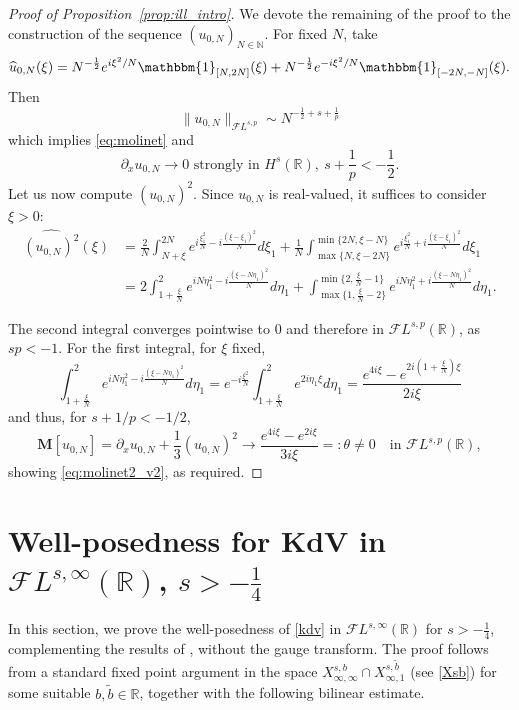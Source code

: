 \documentclass[%
11pt,  reqno]{amsart}
\newcommand{\5}{\textup{V}}
\newcommand{\noi}{\noindent}
\newcommand{\FL}{\mathcal{F} L}
\newcommand{\F}{\mathcal{F}}
\newcommand{\wt}{\widetilde}
\newcommand{\dx}{\partial_x}
\theoremstyle{remark}
\newcommand{\R}{\mathbb{R}}
\newcommand{\MMb}{\mathbf{M}}
\newcommand{\N}{\mathbb{N}}
\numberwithin{equation}{section}
\numberwithin{theorem}{section}
\begin{document}
\begin{proof}[Proof of Proposition~\ref{prop:ill_intro}]
We devote the remaining of the proof to the construction of the sequence $(u_{0,N})_{N\in\N}$. 
	For fixed $N$, take
	$$
	\widehat{u}_{0,N}(\xi)= N^{-\frac12} e^{i\xi^2/N}\mathbbm{1}_{[N, 2N]}(\xi) + N^{-\frac12} e^{-i\xi^2/N}\mathbbm{1}_{[-2N, -N]}(\xi).
	$$
	Then 
	$$
	\|u_{0,N}\|_{\mathcal{F}L^{s,p}} \sim N^{-\frac12 +s+ \frac1p}
	$$
	which implies \eqref{eq:molinet} and
	$$
	\dx u_{0,N} \to 0 \mbox{ strongly in }H^{s}(\R), \ s+\frac1p<-\frac12.
	$$
	Let us now compute $(u_{0,N})^2$. Since $u_{0,N}$ is real-valued, it suffices to consider $\xi>0$:
	\begin{align*}
		\widehat{(u_{0,N})^2}(\xi) &= \frac{2}{N}\int_{N+\xi}^{2N} e^{i\frac{\xi_1^2}{N}-i\frac{(\xi-\xi_1)^2}{N}}d\xi_1 + \frac{1}{N}\int_{\max\{N, \xi-2N\}}^{\min\{2N, \xi-N\}}  e^{i\frac{\xi_1^2}{N}+i\frac{(\xi-\xi_1)^2}{N}}d\xi_1\\&=2\int_{1+\frac\xi N}^{2} e^{iN\eta_1^2-i\frac{(\xi-N\eta_1)^2}{N}}d\eta_1 + \int_{\max\{1, \frac{\xi}{N}-2\}}^{\min\{2, \frac{\xi}{N}-1\}}  e^{iN\eta_1^2+i\frac{(\xi-N\eta_1)^2}{N}}d\eta_1
        .
	\end{align*}


    \noi
The second integral converges pointwise to $0$ and therefore in $\mathcal{F}L^{s,p}(\R)$, as $sp<-1$. For the first integral,  for $\xi$ fixed,
\begin{equation}
	\int_{1+\frac\xi N}^{2} e^{iN\eta_1^2-i\frac{(\xi-N\eta_1)^2}{N}}d\eta_1 = e^{-i\frac{\xi^2}{N}}\int_{1 + \frac{\xi}{N}}^{2} e^{2i\eta_1\xi}d\eta_1  = \frac{e^{4i\xi}-e^{2i\left(1+\frac{\xi}{N}\right)\xi}}{2i\xi}
\end{equation}
and thus, for $s+1/p<-1/2$,
\begin{equation}
	\MMb[u_{0,N}]= \dx u_{0,N} + \frac13 (u_{0,N})^2 \to \frac{e^{4i\xi}-e^{2i\xi}}{3i\xi} =: \theta \ne 0
    \quad \mbox{in }\mathcal{F}L^{s,p}(\R),
\end{equation}
showing \eqref{eq:molinet2_v2}, as required.
\end{proof}


\appendix


\section{Well-posedness for KdV in $\F L^{s,\infty}(\R)$, $s>-\frac14$}\label{sec:-14}

In this section, we prove the well-posedness of \eqref{kdv}
 in $\FL^{s, \infty}(\R)$ for $s>-\frac14$, complementing the results of \cite{Grunrock_ldv_hier}, without the gauge transform. 
The proof follows from a standard fixed point argument in the space $X^{s, b}_{\infty, \infty} \cap X^{s, \wt b }_{\infty, 1}$ (see \eqref{Xsb}) for some  suitable $b,\wt b\in \R$,
together with the following bilinear estimate. 
\end{document}
